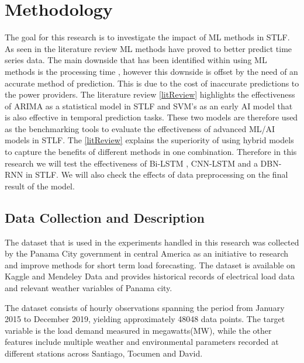 \chapter{Methodology}

The goal for this research is to investigate the impact of ML methods in STLF. As seen in the literature review ML methods have proved to better predict time series data. The main downside that has been identified within using ML methods is the processing time , however this downside is offset by the need of an accurate method of prediction. This is due to the cost of inaccurate predictions to the power providers. The literature review \ref{litReview} highlights the effectiveness of ARIMA as a statistical model in STLF and SVM's as an early AI model that is also effective in temporal prediction tasks. These two models are therefore used as the benchmarking tools to evaluate the effectiveness of advanced ML/AI models in STLF. The \ref{litReview} explains the superiority of using hybrid models to capture the benefits of different methods in one combination. Therefore in this research we will test the effectiveness of Bi-LSTM , CNN-LSTM and a DBN-RNN in STLF. We will also check the effects of data preprocessing on the final result of the model.

\section{Data Collection and Description}
The dataset that is used in the experiments handled in this research was collected by the Panama City government in central America as an initiative to research and improve  methods for short term load forecasting. The dataset is available on Kaggle and  Mendeley Data and provides historical records of electrical load data and relevant weather variables of Panama city\cite{dataset}.

The dataset consists of hourly observations spanning the period from January 2015 to December 2019, yielding approximately 48048 data points. The target variable is the load demand measured in megawatts(MW), while the other features include multiple weather and environmental parameters recorded at different stations across Santiago, Tocumen and David. 

